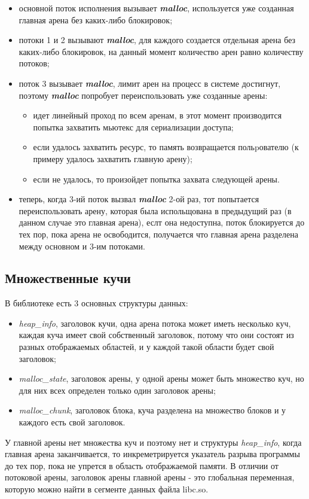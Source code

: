 \begin{itemize}
	\item основной поток исполнения вызывает \textbf{\textit{malloc}}, используется уже созданная главная арена без каких-либо блокировок;
	\item потоки 1 и 2 вызывают \textbf{\textit{malloc}}, для каждого создается отдельная арена без каких-либо блокировок, на данный момент количество арен равно количеству потоков;
	\item поток 3 вызывает \textbf{\textit{malloc}}, лимит арен на процесс в системе достигнут, поэтому \textbf{\textit{malloc}} попробует переиспользовать уже созданные арены:
	\begin{itemize}[$\star$]
		\item идет линейный проход по всем аренам, в этот момент производится попытка захватить мьютекс для сериализации доступа;
		\item если удалось захватить ресурс, то память возвращается польpователю (к примеру удалось захватить главную арену);
		\item если не удалось, то произойдет попытка захвата следующей арены.
	\end{itemize}
	\item теперь, когда 3-ий поток вызвал \textbf{\textit{malloc}} 2-ой раз, тот попытается переиспользовать арену, которая была испольщована в предыдущий раз (в данном случае это главная арена), еслт она недоступна, поток блокируется до тех пор, пока арена не освободится, получается что главная арена разделена между основном и 3-им потоками.
\end{itemize}

\subsection{Множественные кучи}
В библиотеке есть 3 основных структуры данных:
\begin{itemize}
	\item \textit{heap\_info}, заголовок кучи, одна арена потока может иметь несколько куч, каждая куча имеет свой собственный заголовок, потому что они состоят из разных отображаемых областей, и у каждой такой области будет свой заголовок;
	\item \textit{malloc\_state}, заголовок арены, у одной арены может быть множество куч, но для них всех определен только один заголовок арены;
	\item \textit{malloc\_chunk}, заголовок блока, куча разделена на множество блоков и у каждого есть свой заголовок.
\end{itemize}
У главной арены нет множества куч и поэтому нет и структуры \textit{heap\_info}, когда главная арена заканчивается, то инкреметрируется указатель разрыва программы до тех пор, пока не упрется в область отображаемой памяти. В отличии от потоковой арены, заголовок арены главной арены - это глобальная переменная, которую можно найти в сегменте данных файла libc.so.

